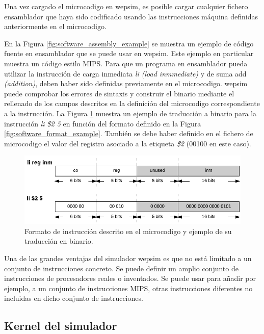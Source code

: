 Una vez cargado el \gls{microcodigo} en \acrshort{wepsim}, es posible cargar cualquier fichero \gls{ensamblador} que haya sido codificado usando las instrucciones  máquina definidas anteriormente en el \gls{microcodigo}.

En la Figura \ref{fig:software_assembly_example} se muestra un ejemplo de código fuente en \gls{ensamblador} que se puede usar en \acrshort{wepsim}. Este ejemplo en particular muestra un código estilo MIPS. Para que un programa en \gls{ensamblador} pueda utilizar la instrucción de carga inmediata \emph{li (load inmmediate)} y de suma add \emph{(addition)}, deben haber sido definidas previamente en el \gls{microcodigo}. \acrshort{wepsim} puede comprobar los errores de sintaxis y construir el binario mediante el rellenado de los campos descritos en la definición del \gls{microcodigo} correspondiente a la instrucción. La Figura \ref{fig:software_assembly_traduction} muestra un ejemplo de traducción a binario para la instrucción \emph{li \$2 5} en función del formato definido en la Figura \ref{fig:software_format_example}. También se debe haber definido en el fichero de \gls{microcodigo} el valor del registro asociado a la etiqueta \emph{\$2} (00100 en este caso).

\begin{figure}[htbp]
 	\centering
 	\includegraphics[width=14cm]{figures/instruction_example_traduction}
 	\caption{Formato de instrucción descrito en el \gls{microcodigo} y ejemplo de su traducción en binario.}
	\label{fig:software_assembly_traduction}
\end{figure}

Una de las grandes ventajas del simulador \acrshort{wepsim} es que no está limitado a un conjunto de instrucciones concreto. Se puede definir un amplio conjunto de instrucciones de procesadores reales o inventados. Se puede usar para añadir por ejemplo, a un conjunto de instrucciones MIPS, otras instrucciones diferentes no incluidas en dicho conjunto de instrucciones.

\subsection{Kernel del simulador}
\label{sec:kernel_simulator}

